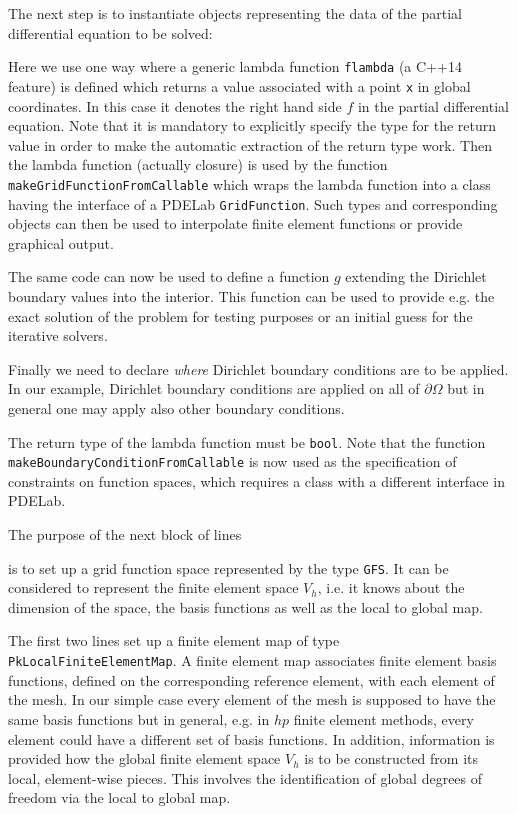\documentclass[a4paper,12pt]{article}
\begin{document}
The next step is to instantiate objects representing the
data of the partial differential equation to be solved:

Here we use one way where a generic lambda function \lstinline{flambda}
(a C++14 feature) is defined which returns a value associated
with a point \lstinline{x} in global coordinates. In this case it denotes the
right hand side $f$ in the partial differential equation. Note that it is 
mandatory to explicitly specify the type for the return value in order
to make the automatic extraction of the return type work. Then the lambda
function (actually closure) is used by the function \lstinline{makeGridFunctionFromCallable}
which wraps the lambda function into a class having the interface of a PDELab \lstinline{GridFunction}.
Such types and corresponding objects can then be used to interpolate
finite element functions or provide graphical output.

The same code can now be used to define a function $g$ extending the Dirichlet
boundary values into the interior. This function can be used 
to provide e.g. the exact solution of the problem for testing purposes
or an initial guess for the iterative solvers.


Finally we need to declare {\em where} Dirichlet boundary conditions 
are to be applied. In our example,
Dirichlet boundary conditions are applied on all of $\partial\Omega$ but
in general one may apply also other boundary conditions.

The return type of the lambda function must be \lstinline{bool}.
Note that the function \lstinline{makeBoundaryConditionFromCallable}
is now used as the specification of constraints on function spaces, which requires
a class with a different interface in PDELab.

The purpose of the next block of lines

is to set up a grid function space represented by the type \lstinline{GFS}.
It can be considered to represent the finite element space $V_h$, i.e.
it knows about the dimension of the space, the basis functions as well
as the local to global map. 

The first two lines set up a finite element map of type
\lstinline{PkLocalFiniteElementMap}. A finite element map associates
finite element basis functions, defined on the corresponding reference element, 
with each element of the mesh. In our
simple case every element of the mesh is supposed to have
the same basis functions but in general, e.g. in $hp$ finite element methods,
every element could have a different set of basis functions. In addition,
information is provided how the global finite element space $V_h$
is to be constructed from its local, element-wise pieces. This involves
the identification of global degrees of freedom via the local to global map.
\end{document}
